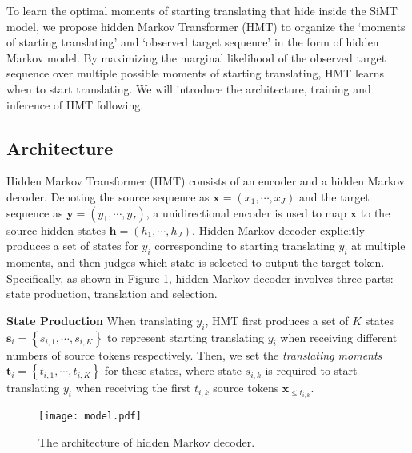 \documentclass{article} %
\begin{document}
To learn the optimal moments of starting translating that hide inside the SiMT model, we propose hidden Markov Transformer (HMT) to organize the `moments of starting translating' and `observed target sequence' in the form of hidden Markov model. By maximizing the marginal likelihood of the observed target sequence over multiple possible moments of starting translating, HMT learns when to start translating. We will introduce the architecture, training and inference of HMT following.



\subsection{Architecture}


Hidden Markov Transformer (HMT) consists of an encoder and a hidden Markov decoder. Denoting the source sequence as $\mathbf{x}\!=\!\left ( x_{1},\cdots ,x_{J} \right )$ and the target sequence as $\mathbf{y}\!=\!\left ( y_{1},\cdots ,y_{I} \right )$, a unidirectional encoder \citep{Arivazhagan2019,Ma2019a,miao-etal-2021-generative} is used to map $\mathbf{x}$ to the source hidden states $\mathbf{h}\!=\!\left ( h_{1},\cdots ,h_{J} \right )$. Hidden Markov decoder explicitly produces a set of states for $y_{i}$ corresponding to starting translating $y_{i}$ at multiple moments, and then judges which state is selected to output the target token. Specifically, as shown in Figure \ref{fig:model}, hidden Markov decoder involves three parts: state production, translation and selection.

\textbf{State Production} 
When translating $y_{i}$, HMT first produces a set of $K$ states $\mathbf{s}_{i}\!=\!\left \{ s_{i,1},\cdots ,s_{i,K} \right \}$ to represent starting translating $y_{i}$ when receiving different numbers of source tokens respectively. Then, we set the \emph{translating moments} $\mathbf{t}_{i}\!=\!\left \{ t_{i,1},\cdots ,t_{i,K} \right \}$ for these states, where state $s_{i,k}$ is required to start translating $y_{i}$ when receiving the first $t_{i,k}$ source tokens $\mathbf{x}_{\leq t_{i,k}}$.


\begin{figure}[t]
    \centering
    \texttt{[image: model.pdf]}
    \vspace{-0.2in}
    \caption{The architecture of hidden Markov decoder.}
    \label{fig:model}
\end{figure}
\end{document}
